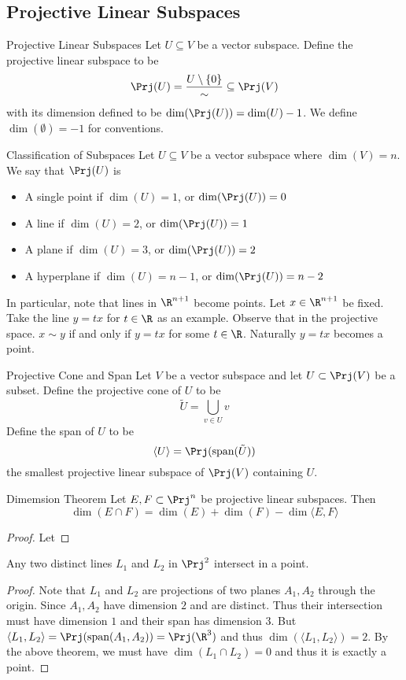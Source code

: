 \subsection{Projective Linear Subspaces}
\begin{defn}{Projective Linear Subspaces}{} Let $U\subseteq V$ be a vector subspace. Define the projective linear subspace to be $$\Prj(U)=\frac{U\setminus\{0\}}{\sim}\subseteq\Prj(V)$$ with its dimension defined to be $\dim(\Prj(U))=\dim(U)-1$. We define $\dim(\emptyset)=-1$ for conventions. 
\end{defn}

\begin{defn}{Classification of Subspaces}{} Let $U\subseteq V$ be a vector subspace where $\dim(V)=n$. We say that $\Prj(U)$ is
\begin{itemize}
\item A single point if $\dim(U)=1$, or $\dim(\Prj(U))=0$
\item A line if $\dim(U)=2$, or $\dim(\Prj(U))=1$
\item A plane if $\dim(U)=3$, or $\dim(\Prj(U))=2$
\item A hyperplane if $\dim(U)=n-1$, or $\dim(\Prj(U))=n-2$
\end{itemize}
\end{defn}

In particular, note that lines in $\R^{n+1}$ become points. Let $x\in\R^{n+1}$ be fixed. Take the line $y=tx$ for $t\in\R$ as an example. Observe that in the projective space. $x\sim y$ if and only if $y=tx$ for some $t\in\R$. Naturally $y=tx$ becomes a point. 

\begin{defn}{Projective Cone and Span}{} Let $V$ be a vector subspace and let $U\subset\Prj(V)$ be a subset. Define the projective cone of $U$ to be $$\tilde{U}=\bigcup_{v\in U}v$$ Define the span of $U$ to be $$\langle U\rangle=\Prj(\text{span}(\tilde{U}))$$ the smallest projective linear subspace of $\Prj(V)$ containing $U$. 
\end{defn}

\begin{thm}{Dimemsion Theorem}{} Let $E,F\subset\Prj^n$ be projective linear subspaces. Then $$\dim(E\cap F)=\dim(E)+\dim(F)-\dim\langle E,F\rangle$$ \tcbline
\begin{proof}
Let 
\end{proof}
\end{thm}

\begin{thm}{}{} Any two distinct lines $L_1$ and $L_2$ in $\Prj^2$ intersect in a point. \tcbline
\begin{proof}
Note that $L_1$ and $L_2$ are projections of two planes $A_1,A_2$ through the origin. Since $A_1,A_2$ have dimension $2$ and are distinct. Thus their intersection must have dimension $1$ and their span has dimension $3$. But $\langle L_1,L_2\rangle=\Prj(\text{span}(A_1,A_2))=\Prj(\R^3)$ and thus $\dim(\langle L_1,L_2\rangle)=2$. By the above theorem, we must have $\dim(L_1\cap L_2)=0$ and thus it is exactly a point. 
\end{proof}
\end{thm}

